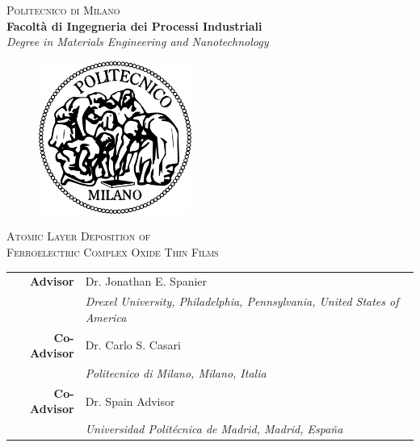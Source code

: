 \thispagestyle{empty}
\begin{titlepage}
\vspace*{-1.5cm}
\begin{center}
  {\LARGE
  \textsc{Politecnico di Milano}\\
  \textbf{\Large
  Facolt\`a di Ingegneria dei Processi Industriali}\\
  \emph{\large Degree in Materials Engineering and Nanotechnology}}\\
  \vspace*{1truecm}
  \begin{figure}[htbp]
    \begin{center}
      \includegraphics[width=5cm]{./pictures/logopm.png}
    \end{center}
  \end{figure}
  \vspace*{0.3cm}
  
   {\huge\textsc{
  Atomic Layer Deposition of \\
  Ferroelectric Complex Oxide Thin Films\\
  }}

  
  
\end{center}
\vspace*{2.0cm} \large
\begin{flushleft}

\begin{tabular*}{0.75\textwidth}{>{\bfseries}r l}
  Advisor & Dr. Jonathan E. Spanier \\
  & \emph{\small Drexel University, Philadelphia, Pennsylvania, United States of America}\\
  Co-Advisor  & Dr. Carlo S. Casari \\
  & \emph{\small Politecnico di Milano, Milano, Italia}\\
  Co-Advisor  & Dr. Spain Advisor \\
  & \emph{\small Universidad Polit\'ecnica de Madrid, Madrid, Espa\~na}\\
\end{tabular*}



\end{flushleft}
\end{titlepage}

